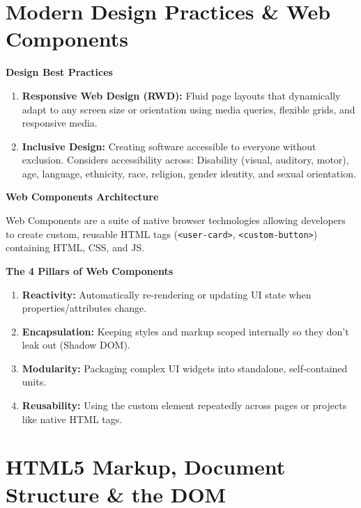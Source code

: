 \documentclass[8pt, a4paper]{article}
\begin{document}
\section{Modern Design Practices \& Web Components}

\begin{conceptbox}
\textbf{Design Best Practices}
\begin{enumerate}
  \item \textbf{Responsive Web Design (RWD):} Fluid page layouts that dynamically adapt to any screen size
        or orientation using media queries, flexible grids, and responsive media.
  \item \textbf{Inclusive Design:} Creating software accessible to everyone without exclusion. Considers
        accessibility across: Disability (visual, auditory, motor), age, language, ethnicity, race,
        religion, gender identity, and sexual orientation.
\end{enumerate}
\end{conceptbox}

\begin{conceptbox}
\textbf{Web Components Architecture}

Web Components are a suite of native browser technologies allowing developers to create custom, reusable
HTML tags (\texttt{<user-card>}, \texttt{<custom-button>}) containing HTML, CSS, and JS.

\medskip
\textbf{The 4 Pillars of Web Components}
\begin{enumerate}
  \item \textbf{Reactivity:} Automatically re-rendering or updating UI state when properties/attributes change.
  \item \textbf{Encapsulation:} Keeping styles and markup scoped internally so they don't leak out (Shadow DOM).
  \item \textbf{Modularity:} Packaging complex UI widgets into standalone, self-contained units.
  \item \textbf{Reusability:} Using the custom element repeatedly across pages or projects like native HTML tags.
\end{enumerate}
\end{conceptbox}

\section{HTML5 Markup, Document Structure \& the DOM}
\end{document}
